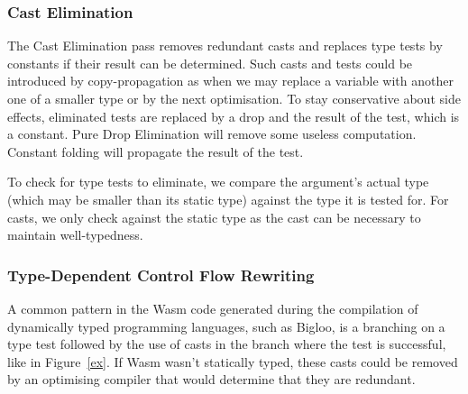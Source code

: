 \documentclass[a4paper,11pt]{article}
\begin{document}
\subsubsection{Cast Elimination}
The Cast Elimination pass removes redundant casts and replaces type tests by
constants if their result can be determined. Such casts and tests could be
introduced by copy-propagation as when we may replace a variable with another
one of a smaller type or by the next optimisation. To stay conservative about
side effects, eliminated tests are replaced by a \textsf{drop} and the result of
the test, which is a constant. Pure Drop Elimination will remove some useless
computation. Constant folding will propagate the result of the test.

To check for type tests to eliminate, we compare the argument's actual type
(which may be smaller than its static type) against the type it is tested for.
For casts, we only check against the static type as the cast can be necessary to
maintain well-typedness.

\subsubsection{Type-Dependent Control Flow Rewriting}
A common pattern in the Wasm code generated during the compilation of
dynamically typed programming languages, such as Bigloo, is a branching on a
type test followed by the use of casts in the branch where the test is
successful, like in Figure~\ref{ex}. If Wasm wasn't statically typed, these
casts could be removed by an optimising compiler that would determine that they
are redundant.
\end{document}
